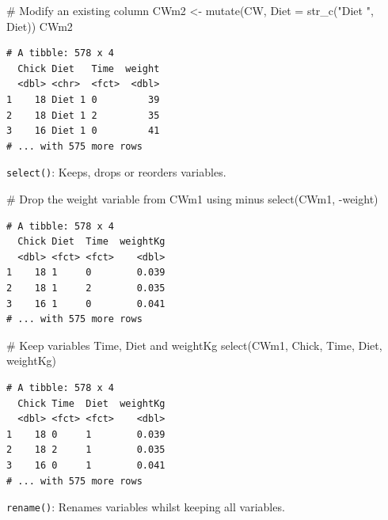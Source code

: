 \documentclass[
  letterpaper,
  DIV=11,
  numbers=noendperiod]{scrreprt}
\newenvironment{Shaded}{\begin{snugshade}}{\end{snugshade}}
\newcommand{\AttributeTok}[1]{\textcolor[rgb]{0.40,0.45,0.13}{#1}}
\newcommand{\CommentTok}[1]{\textcolor[rgb]{0.37,0.37,0.37}{#1}}
\newcommand{\FunctionTok}[1]{\textcolor[rgb]{0.28,0.35,0.67}{#1}}
\newcommand{\NormalTok}[1]{\textcolor[rgb]{0.00,0.23,0.31}{#1}}
\newcommand{\OtherTok}[1]{\textcolor[rgb]{0.00,0.23,0.31}{#1}}
\newcommand{\SpecialCharTok}[1]{\textcolor[rgb]{0.37,0.37,0.37}{#1}}
\newcommand{\StringTok}[1]{\textcolor[rgb]{0.13,0.47,0.30}{#1}}
\theoremstyle{definition}
\theoremstyle{plain}
\theoremstyle{plain}
\theoremstyle{remark}
\begin{document}
\begin{Shaded}
\begin{Highlighting}[]
\CommentTok{\# Modify an existing column}
\NormalTok{CWm2 }\OtherTok{\textless{}{-}} \FunctionTok{mutate}\NormalTok{(CW, }\AttributeTok{Diet =} \FunctionTok{str\_c}\NormalTok{(}\StringTok{"Diet "}\NormalTok{, Diet))}
\NormalTok{CWm2}
\end{Highlighting}
\end{Shaded}

\begin{verbatim}
# A tibble: 578 x 4
  Chick Diet   Time  weight
  <dbl> <chr>  <fct>  <dbl>
1    18 Diet 1 0         39
2    18 Diet 1 2         35
3    16 Diet 1 0         41
# ... with 575 more rows
\end{verbatim}

\hfill\break

\texttt{select()}: Keeps, drops or reorders variables.

\begin{Shaded}
\begin{Highlighting}[]
\CommentTok{\# Drop the weight variable from CWm1 using minus}
\FunctionTok{select}\NormalTok{(CWm1, }\SpecialCharTok{{-}}\NormalTok{weight)}
\end{Highlighting}
\end{Shaded}

\begin{verbatim}
# A tibble: 578 x 4
  Chick Diet  Time  weightKg
  <dbl> <fct> <fct>    <dbl>
1    18 1     0        0.039
2    18 1     2        0.035
3    16 1     0        0.041
# ... with 575 more rows
\end{verbatim}

\begin{Shaded}
\begin{Highlighting}[]
\CommentTok{\# Keep variables Time, Diet and weightKg}
\FunctionTok{select}\NormalTok{(CWm1, Chick, Time, Diet, weightKg)}
\end{Highlighting}
\end{Shaded}

\begin{verbatim}
# A tibble: 578 x 4
  Chick Time  Diet  weightKg
  <dbl> <fct> <fct>    <dbl>
1    18 0     1        0.039
2    18 2     1        0.035
3    16 0     1        0.041
# ... with 575 more rows
\end{verbatim}

\hfill\break

\texttt{rename()}: Renames variables whilst keeping all variables.
\end{document}
